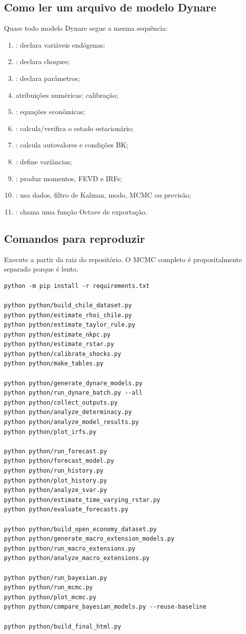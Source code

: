 \documentclass[11pt,a4paper]{article}
\begin{document}
\subsection{Como ler um arquivo de modelo Dynare}
Quase todo modelo Dynare segue a mesma sequência:
\begin{enumerate}[nosep]
  \item {}: declara variáveis endógenas;
  \item {}: declara choques;
  \item {}: declara parâmetros;
  \item atribuições numéricas: calibração;
  \item {}: equações econômicas;
  \item {}: calcula/verifica o estado estacionário;
  \item {}: calcula autovalores e condições BK;
  \item {}: define variâncias;
  \item {}: produz momentos, FEVD e IRFs;
  \item {}: usa dados, filtro de Kalman, modo, MCMC ou previsão;
  \item {}: chama uma função Octave de exportação.
\end{enumerate}

\subsection{Comandos para reproduzir}
Execute a partir da raiz do repositório. O MCMC completo é propositalmente separado porque é lento.

\begin{Verbatim}[fontsize=\scriptsize]
python -m pip install -r requirements.txt

python python/build_chile_dataset.py
python python/estimate_rhoi_chile.py
python python/estimate_taylor_rule.py
python python/estimate_nkpc.py
python python/estimate_rstar.py
python python/calibrate_shocks.py
python python/make_tables.py

python python/generate_dynare_models.py
python python/run_dynare_batch.py --all
python python/collect_outputs.py
python python/analyze_determinacy.py
python python/analyze_model_results.py
python python/plot_irfs.py

python python/run_forecast.py
python python/forecast_model.py
python python/run_history.py
python python/plot_history.py
python python/analyze_svar.py
python python/estimate_time_varying_rstar.py
python python/evaluate_forecasts.py

python python/build_open_economy_dataset.py
python python/generate_macro_extension_models.py
python python/run_macro_extensions.py
python python/analyze_macro_extensions.py

python python/run_bayesian.py
python python/run_mcmc.py
python python/plot_mcmc.py
python python/compare_bayesian_models.py --reuse-baseline

python python/build_final_html.py
\end{Verbatim}
\end{document}
